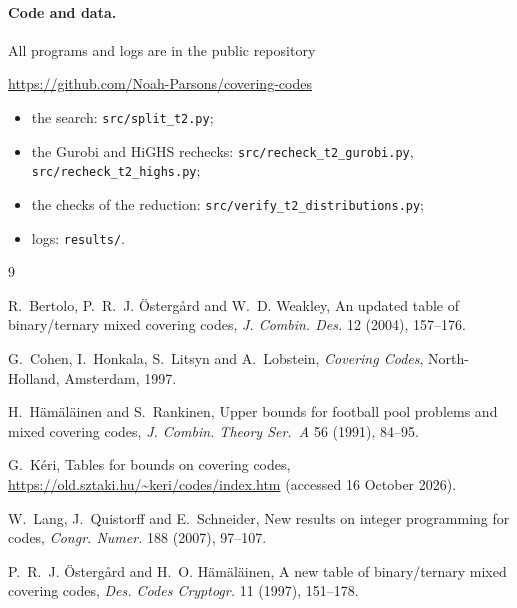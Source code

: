 \documentclass[11pt]{article}
\theoremstyle{remark}
\begin{document}
\paragraph{Code and data.} All programs and logs are in the public repository
\begin{center}\url{https://github.com/Noah-Parsons/covering-codes}\end{center}
\begin{itemize}
\item the search: \texttt{src/split\_t2.py};
\item the Gurobi and HiGHS rechecks: \texttt{src/recheck\_t2\_gurobi.py},
  \texttt{src/recheck\_t2\_highs.py};
\item the checks of the reduction: \texttt{src/verify\_t2\_distributions.py};
\item logs: \texttt{results/}.
\end{itemize}

\begin{thebibliography}{9}

 R.~Bertolo, P.~R.~J. Östergård and W.~D. Weakley, An updated table of
binary/ternary mixed covering codes, \emph{J. Combin. Des.} 12 (2004), 157--176.

 G.~Cohen, I.~Honkala, S.~Litsyn and A.~Lobstein, \emph{Covering Codes},
North-Holland, Amsterdam, 1997.

 H.~Hämäläinen and S.~Rankinen, Upper bounds for football pool problems and mixed
covering codes, \emph{J. Combin. Theory Ser.~A} 56 (1991), 84--95.

 G.~Kéri, Tables for bounds on covering codes,
\url{https://old.sztaki.hu/~keri/codes/index.htm} (accessed 16 October 2026).

 W.~Lang, J.~Quistorff and E.~Schneider, New results on integer programming for
codes, \emph{Congr. Numer.} 188 (2007), 97--107.

 P.~R.~J. Östergård and H.~O. Hämäläinen, A new table of binary/ternary mixed
covering codes, \emph{Des. Codes Cryptogr.} 11 (1997), 151--178.

\end{thebibliography}
\end{document}

